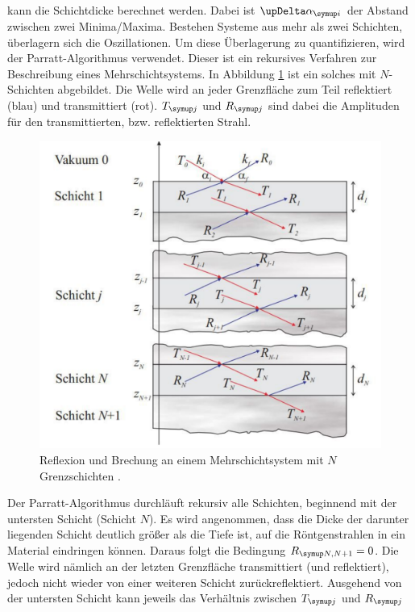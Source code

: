 kann die Schichtdicke berechnet werden. Dabei ist $\upDelta \alpha\idx{i}$ der Abstand zwischen zwei Minima/Maxima.
Bestehen Systeme aus mehr als zwei Schichten, überlagern sich die Oszillationen. Um diese Überlagerung zu quantifizieren, wird der 
Parratt-Algorithmus verwendet. Dieser ist ein rekursives Verfahren zur Beschreibung eines Mehrschichtsystems. 
In Abbildung \ref{fig:multischichtsystem} ist ein solches mit $N$-Schichten abgebildet. Die Welle wird an jeder Grenzfläche zum Teil 
reflektiert (blau) und transmittiert (rot). $T\idx{j}$ und $R\idx{j}$ sind dabei die Amplituden für den transmittierten, bzw. reflektierten 
Strahl.
\begin{figure}[H]
  \centering
  \includegraphics[scale=0.4]{mehrschichtsystem.pdf}
  \caption{Reflexion und Brechung an einem Mehrschichtsystem mit $N$ Grenzschichten \cite{Bachelorarbeit_Bertram}.}
  \label{fig:multischichtsystem}
\end{figure}
\noindent
Der Parratt-Algorithmus durchläuft rekursiv alle Schichten, beginnend mit der untersten Schicht (Schicht $N$). 
Es wird angenommen, dass die Dicke der darunter liegenden Schicht deutlich größer als die Tiefe ist, auf die Röntgenstrahlen 
in ein Material eindringen können. Daraus folgt die Bedingung $R\idx{N,N+1}=0$. Die Welle wird nämlich an der letzten 
Grenzfläche transmittiert (und reflektiert), jedoch nicht wieder von einer weiteren Schicht zurückreflektiert. 
Ausgehend von der untersten Schicht kann jeweils das Verhältnis zwischen $T\idx{j}$ und $R\idx{j}$ 
